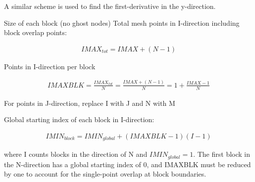 \documentclass[twocolumn,10pt]{asme2ej}
\begin{document}
\noindent A similar scheme is used to find the first-derivative in the y-direction.

Size of each block (no ghost nodes)
Total mesh points in I-direction including block overlap points:

\begin{equation}
\begin{split}
IMAX_{tot} = IMAX + (N-1)
\end{split}
\label{overlappoints}
\end{equation}

Points in I-direction per block

\begin{equation}
\begin{split}
IMAXBLK = \frac{IMAX_{tot}}{N} = \frac{IMAX + (N-1)}{N} = 1 + \frac{IMAX-1}{N}
\end{split}
\label{pointsperblock}
\end{equation}

For points in J-direction, replace I with J and N with M

Global starting index of each block in I-direction:

\begin{equation}
\begin{split}
IMIN_{block} = IMIN_{global} + (IMAXBLK-1)(I-1)
\end{split}
\label{blockstartingindex}
\end{equation}

\noindent where I counts blocks in the direction of N and $IMIN_{global}=1$.  The first block in the N-direction has a global starting index of 0, and IMAXBLK must be reduced by one to account for the single-point overlap at block boundaries.



\end{document}
